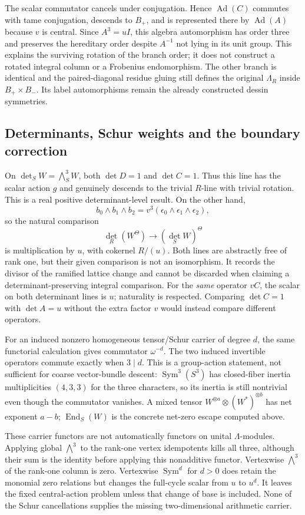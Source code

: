 \documentclass[11pt]{article}
\theoremstyle{definition}\newtheorem{definition}[theorem]{Definition}
\theoremstyle{remark}\newtheorem{remark}[theorem]{Remark}
\begin{document}
The scalar commutator cancels under conjugation. Hence $\operatorname{Ad}(C)$ commutes with tame conjugation, descends to $B_+$, and is represented there by $\operatorname{Ad}(A)$ because $v$ is central. Since $A^3=uI$, this algebra automorphism has order three and preserves the hereditary order despite $A^{-1}$ not lying in its unit group. This explains the surviving rotation of the branch order; it does not construct a rotated integral column or a Frobenius endomorphism. The other branch is identical and the paired-diagonal residue gluing still defines the original $\Lambda_R$ inside $B_+\times B_-$. Its label automorphisms remain the already constructed dessin symmetries.

\subsection{Determinants, Schur weights and the boundary correction}
On $\det_S W=\bigwedge_S^3W$, both $\det D=1$ and $\det C=1$. Thus this line has the scalar action $g$ and genuinely descends to the trivial $R$-line with trivial rotation. This is a real positive determinant-level result. On the other hand,
\[
 b_0\wedge b_1\wedge b_2=v^3(\epsilon_0\wedge\epsilon_1\wedge\epsilon_2),
\]
so the natural comparison
\[
 \det_R(W^\Theta)\longrightarrow(\det_S W)^\Theta
\]
is multiplication by $u$, with cokernel $R/(u)$. Both lines are abstractly free of rank one, but their given comparison is not an isomorphism. It records the divisor of the ramified lattice change and cannot be discarded when claiming a determinant-preserving integral comparison. For the \emph{same} operator $vC$, the scalar on both determinant lines is $u$; naturality is respected. Comparing $\det C=1$ with $\det A=u$ without the extra factor $v$ would instead compare different operators.

For an induced nonzero homogeneous tensor/Schur carrier of degree $d$, the same functorial calculation gives commutator $\omega^{-d}$. The two induced invertible operators commute exactly when $3\mid d$. This is a group-action statement, not sufficient for coarse vector-bundle descent: $\operatorname{Sym}^3(S^3)$ has closed-fiber inertia multiplicities $(4,3,3)$ for the three characters, so its inertia is still nontrivial even though the commutator vanishes. A mixed tensor $W^{\otimes a}\otimes(W^*)^{\otimes b}$ has net exponent $a-b$; $\operatorname{End}_S(W)$ is the concrete net-zero escape computed above.

These carrier functors are not automatically functors on unital $\Lambda$-modules. Applying global $\bigwedge^3$ to the rank-one vertex idempotents kills all three, although their sum is the identity before applying this nonadditive functor. Vertexwise $\bigwedge^3$ of the rank-one column is zero. Vertexwise $\operatorname{Sym}^d$ for $d>0$ does retain the monomial zero relations but changes the full-cycle scalar from $u$ to $u^d$. It leaves the fixed central-action problem unless that change of base is included. None of the Schur cancellations supplies the missing two-dimensional arithmetic carrier.
\end{document}
